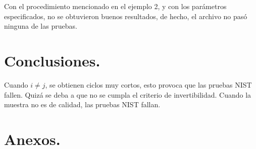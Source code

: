 \documentclass[12pt,3p]{elsarticle}
\begin{document}
Con el procedimiento mencionado en el ejemplo 2, y con los parámetros especificados, no se obtuvieron buenos resultados, de hecho, el archivo no pasó ninguna de las pruebas.







\section{Conclusiones.}
Cuando $i \neq j$, se obtienen ciclos muy cortos, esto provoca que las pruebas NIST fallen. Quizá se deba a que no se cumpla el criterio de invertibilidad. Cuando la muestra no es de calidad, las pruebas NIST fallan.
\section{Anexos.}
\end{document}
